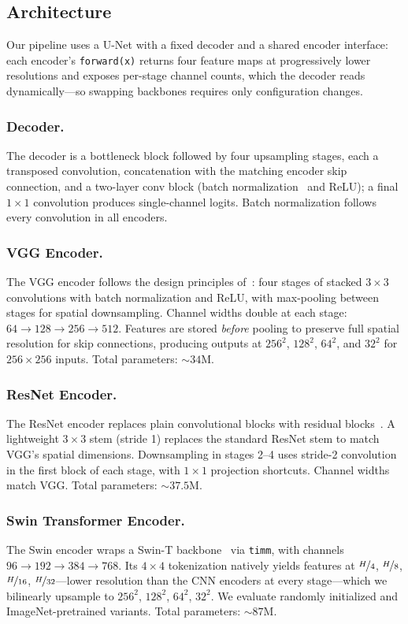 \documentclass[runningheads]{llncs}
\begin{document}
\subsection{Architecture}
\label{sec:architecture}

Our pipeline uses a U-Net with a fixed decoder and a shared encoder interface: each encoder's \texttt{forward(x)} returns four feature maps at progressively lower resolutions and exposes per-stage channel counts, which the decoder reads dynamically---so swapping backbones requires only configuration changes.

\subsubsection{Decoder.}
The decoder is a bottleneck block followed by four upsampling stages, each a transposed convolution, concatenation with the matching encoder skip connection, and a two-layer conv block (batch normalization~\cite{ioffe2015batchnorm} and ReLU); a final $1\times1$ convolution produces single-channel logits. Batch normalization follows every convolution in all encoders.

\subsubsection{VGG Encoder.}
The VGG encoder follows the design principles of~\cite{simonyan2014vgg}: four stages of stacked $3\times3$ convolutions with batch normalization and ReLU, with max-pooling between stages for spatial downsampling. Channel widths double at each stage: $64 \to 128 \to 256 \to 512$. Features are stored \emph{before} pooling to preserve full spatial resolution for skip connections, producing outputs at $256^2$, $128^2$, $64^2$, and $32^2$ for $256\times256$ inputs. Total parameters: ${\sim}34$M.

\subsubsection{ResNet Encoder.}
The ResNet encoder replaces plain convolutional blocks with residual blocks~\cite{he2016resnet}. A lightweight $3\times3$ stem (stride 1) replaces the standard ResNet stem to match VGG's spatial dimensions. Downsampling in stages 2--4 uses stride-2 convolution in the first block of each stage, with $1\times1$ projection shortcuts. Channel widths match VGG. Total parameters: ${\sim}37.5$M.

\subsubsection{Swin Transformer Encoder.}
The Swin encoder wraps a Swin-T backbone~\cite{liu2021swin} via \texttt{timm}, with channels $96 \to 192 \to 384 \to 768$. Its $4\times4$ tokenization natively yields features at $\nicefrac{H}{4}$, $\nicefrac{H}{8}$, $\nicefrac{H}{16}$, $\nicefrac{H}{32}$---lower resolution than the CNN encoders at every stage---which we bilinearly upsample to $256^2$, $128^2$, $64^2$, $32^2$. We evaluate randomly initialized and ImageNet-pretrained variants. Total parameters: ${\sim}87$M.
\end{document}
